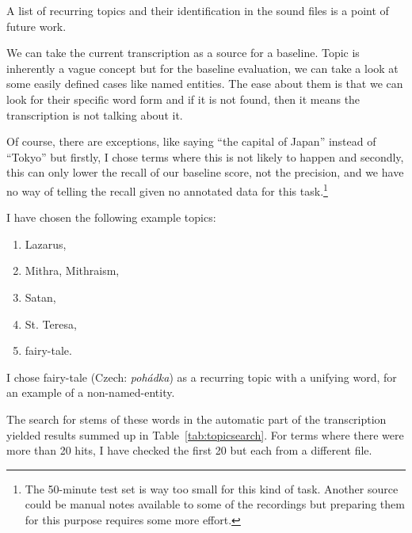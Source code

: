 \documentclass[a4paper,11pt]{article}
\begin{document}
A list of recurring topics and their identification in the sound files is a
point of future work.

We can take the current transcription %
as a source for a baseline.
Topic is inherently a vague concept %
but for the baseline evaluation, we can take a look at some easily defined cases
like named entities. The ease about them is that we can look for their specific
word form and if it is not found, then it means the transcription is not talking
about it.

Of course, there are exceptions, like saying ``the capital of Japan'' instead of
``Tokyo'' but firstly, I chose terms where this is not likely to happen and
secondly, this can only lower the recall of our baseline score, not the
precision, and we have no way of telling the recall given no annotated data
for this task.\footnote{The 50-minute test set is way too small for this kind of
task. Another source could be manual notes available to some of the recordings
but preparing them for this purpose requires some more effort.}

I have chosen the following example topics:

\begin{enumerate}
\item{Lazarus,}
\item{Mithra, Mithraism,}
\item{Satan,}
\item{St. Teresa,}
\item{fairy-tale.}
\end{enumerate}

I chose fairy-tale (Czech: \emph{poh\'{a}dka}) as a recurring topic with a
unifying word, for an example of a non-named-entity.

The search for stems of these words in the automatic part of the transcription
yielded results summed up in Table~\ref{tab:topicsearch}. For terms where there
were more than 20 hits, I have checked the first 20 but each from a different
file.
\end{document}
